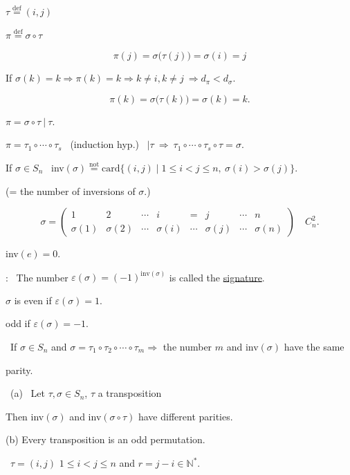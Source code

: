 \documentclass[12pt]{article}
\begin{document}
\noindent $\tau \overset{\text{def}}{=} (i,j)$

\noindent $\pi \overset{\text{def}}{=} \sigma\circ\tau$

\[
\pi(j) = \sigma\big(\tau(j)\big) = \sigma(i) = j
\]

\bigskip
\noindent If $\sigma(k)=k \Rightarrow \pi(k)=k \Rightarrow k\neq i, k\neq j \ \Rightarrow d_\pi<d_\sigma.$

\[
\pi(k) = \sigma\big(\tau(k)\big) = \sigma(k) = k.
\]

\noindent $\pi = \sigma\circ\tau \ \big| \ \tau.$

\bigskip
\noindent $\pi = \tau_1\circ\cdots\circ\tau_s$ \ (induction hyp.) \ $\big|\tau \ \Rightarrow \ \tau_1\circ\cdots\circ\tau_s\circ\tau=\sigma.$

\bigskip
\noindent If $\sigma\in S_n$ \ inv$(\sigma) \overset{\text{not}}{=} \text{card}\{(i,j) \mid 1\leq i<j\leq n,\ \sigma(i)>\sigma(j)\}.$

\noindent (= the number of inversions of $\sigma$.)

\[
\sigma = \begin{pmatrix}1&2&\cdots&i&=&j&\cdots&n\\ \sigma(1)&\sigma(2)&\cdots&\sigma(i)&\cdots&\sigma(j)&\cdots&\sigma(n)\end{pmatrix} \quad C_n^2.
\]

\noindent inv$(e)=0$.

\bigskip
\noindent{}: \ The number $\varepsilon(\sigma) = (-1)^{\text{inv}(\sigma)}$ is called the \underline{signature}.

\bigskip
\noindent $\sigma$ is even if $\varepsilon(\sigma)=1$.

\noindent \phantom{$\sigma$ is }odd if $\varepsilon(\sigma)=-1$.

\bigskip
\noindent{} \ If $\sigma\in S_n$ and $\sigma=\tau_1\circ\tau_2\circ\cdots\circ\tau_m \Rightarrow$ the number $m$ and inv$(\sigma)$ have the same

\noindent parity.

\bigskip
\noindent{} \ (a) \ Let $\tau,\sigma\in S_n$, $\tau$ a transposition

\noindent Then inv$(\sigma)$ and inv$(\sigma\circ\tau)$ have different parities.

\noindent (b) Every transposition is an odd permutation.

\bigskip
\noindent{} \ $\tau=(i,j)$ \quad $1\leq i<j\leq n$ and $r=j-i\in\mathbb{N}^*$.
\end{document}
